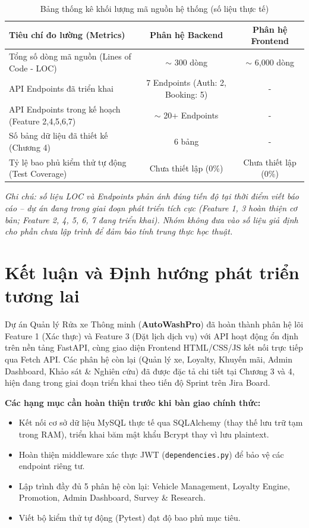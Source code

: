\begin{table}[htbp]
\centering
\caption{Bảng thống kê khối lượng mã nguồn hệ thống (số liệu thực tế)}
\label{tab:metrics}
\begin{tabular}{lcc}
\toprule
\textbf{Tiêu chí đo lường (Metrics)} & \textbf{Phân hệ Backend} & \textbf{Phân hệ Frontend} \\
\midrule
Tổng số dòng mã nguồn (Lines of Code - LOC) & \(\sim\) 300 dòng & \(\sim\) 6,000 dòng \\
API Endpoints đã triển khai & 7 Endpoints (Auth: 2, Booking: 5) & - \\
API Endpoints trong kế hoạch (Feature 2,4,5,6,7) & \(\sim\) 20+ Endpoints & - \\
Số bảng dữ liệu đã thiết kế (Chương 4) & 6 bảng & - \\
Tỷ lệ bao phủ kiểm thử tự động (Test Coverage) & Chưa thiết lập (0\%) & Chưa thiết lập (0\%) \\
\bottomrule
\end{tabular}
\end{table}

\textit{Ghi chú: số liệu LOC và Endpoints phản ánh đúng tiến độ tại thời điểm viết báo cáo -- dự án đang trong giai đoạn phát triển tích cực (Feature 1, 3 hoàn thiện cơ bản; Feature 2, 4, 5, 6, 7 đang triển khai). Nhóm không đưa vào số liệu giả định cho phần chưa lập trình để đảm bảo tính trung thực học thuật.}

\section{Kết luận và Định hướng phát triển tương lai}
Dự án Quản lý Rửa xe Thông minh (\textbf{AutoWashPro}) đã hoàn thành phân hệ lõi Feature 1 (Xác thực) và Feature 3 (Đặt lịch dịch vụ) với API hoạt động ổn định trên nền tảng FastAPI, cùng giao diện Frontend HTML/CSS/JS kết nối trực tiếp qua Fetch API. Các phân hệ còn lại (Quản lý xe, Loyalty, Khuyến mãi, Admin Dashboard, Khảo sát \& Nghiên cứu) đã được đặc tả chi tiết tại Chương 3 và 4, hiện đang trong giai đoạn triển khai theo tiến độ Sprint trên Jira Board.

\noindent \textbf{Các hạng mục cần hoàn thiện trước khi bàn giao chính thức:}
\begin{itemize}
    \item Kết nối cơ sở dữ liệu MySQL thực tế qua SQLAlchemy (thay thế lưu trữ tạm trong RAM), triển khai băm mật khẩu Bcrypt thay vì lưu plaintext.
    \item Hoàn thiện middleware xác thực JWT (\texttt{dependencies.py}) để bảo vệ các endpoint riêng tư.
    \item Lập trình đầy đủ 5 phân hệ còn lại: Vehicle Management, Loyalty Engine, Promotion, Admin Dashboard, Survey \& Research.
    \item Viết bộ kiểm thử tự động (Pytest) đạt độ bao phủ mục tiêu.
\end{itemize}

